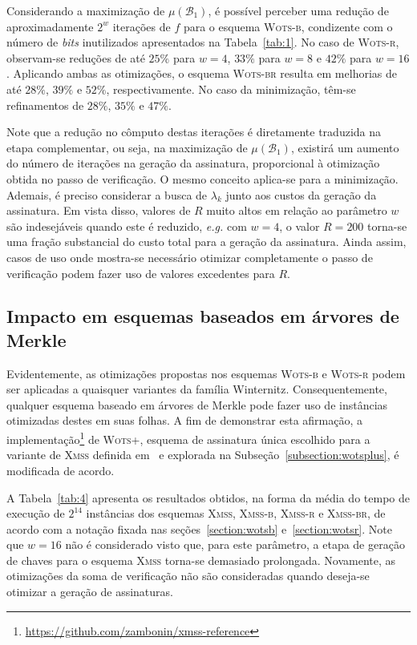 \documentclass[12pt,notitlepage]{report}
\newcommand{\wotsplus}{\textsc{Wots+}}
\newcommand{\xmss}{\textsc{Xmss}}
\newcommand{\xmssb}{\textsc{Xmss-b}}
\newcommand{\xmssr}{\textsc{Xmss-r}}
\newcommand{\xmssbr}{\textsc{Xmss-br}}
\begin{document}
Considerando a maximização de $\mu(\mathcal{B}_1)$, é possível perceber uma redução de aproximadamente $2^w$ iterações de $f$ para o esquema \textsc{Wots-b}, condizente com o número de \emph{bits} inutilizados apresentados na Tabela~\ref{tab:1}. No caso de \textsc{Wots-r}, observam-se reduções de até $25\%$ para $w = 4$, $33\%$ para $w = 8$ e $42\%$ para $w = 16$. Aplicando ambas as otimizações, o esquema \textsc{Wots-br} resulta em melhorias de até $28\%$, $39\%$ e $52\%$, respectivamente. No caso da minimização, têm-se refinamentos de $28\%$, $35\%$ e $47\%$.

Note que a redução no cômputo destas iterações é diretamente traduzida na etapa complementar, ou seja, na maximização de $\mu(\mathcal{B}_1)$, existirá um aumento do número de iterações na geração da assinatura, proporcional à otimização obtida no passo de verificação. O mesmo conceito aplica-se para a minimização. Ademais, é preciso considerar a busca de $\lambda_k$ junto aos custos da geração da assinatura. Em vista disso, valores de $R$ muito altos em relação ao parâmetro $w$ são indesejáveis quando este é reduzido, \emph{e.g.} com $w = 4$, o valor $R = 200$ torna-se uma fração substancial do custo total para a geração da assinatura. Ainda assim, casos de uso onde mostra-se necessário otimizar completamente o passo de verificação podem fazer uso de valores excedentes para $R$.

\subsection{Impacto em esquemas baseados em árvores de Merkle}
\label{subsection:impact}

Evidentemente, as otimizações propostas nos esquemas \textsc{Wots-b} e \textsc{Wots-r} podem ser aplicadas a quaisquer variantes da família Winternitz. Consequentemente, qualquer esquema baseado em árvores de Merkle pode fazer uso de instâncias otimizadas destes em suas folhas. A fim de demonstrar esta afirmação, a implementação\footnote{\url{https://github.com/zambonin/xmss-reference}} de \wotsplus{}, esquema de assinatura única escolhido para a variante de \xmss{} definida em~\cite{irtf-cfrg-xmss-hash-based-signatures-12} e explorada na Subseção~\ref{subsection:wotsplus}, é modificada de acordo.

A Tabela~\ref{tab:4} apresenta os resultados obtidos, na forma da média do tempo de execução de $2^{14}$ instâncias dos esquemas \xmss{}, \xmssb{}, \xmssr{} e \xmssbr{}, de acordo com a notação fixada nas seções~\ref{section:wotsb} e~\ref{section:wotsr}. Note que $w = 16$ não é considerado visto que, para este parâmetro, a etapa de geração de chaves para o esquema \xmss{} torna-se demasiado prolongada. Novamente, as otimizações da soma de verificação não são consideradas quando deseja-se otimizar a geração de assinaturas.
\end{document}
